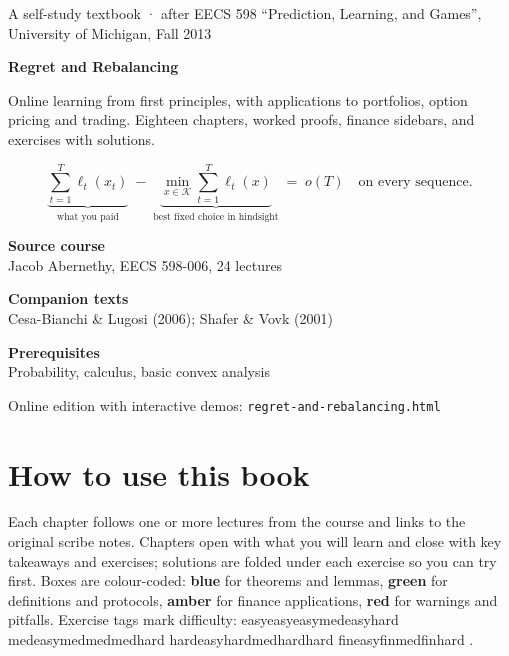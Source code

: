 \documentclass[11pt,a4paper,openany]{book}
\newcommand{\extag}[2]{%
  \def\tmp{#1}\def\tmpE{easy}\def\tmpM{med}\def\tmpH{hard}%
  \ifx\tmp\tmpE\def\tagc{defc}\else\ifx\tmp\tmpM\def\tagc{thmc}\else\ifx\tmp\tmpH\def\tagc{warnc}\else\def\tagc{finc}\fi\fi\fi
  \tcbox[on line,boxrule=0pt,arc=2pt,colback=\tagc!12,left=2pt,right=2pt,top=0pt,bottom=0pt,boxsep=1pt]{\sffamily\scriptsize\bfseries\color{\tagc}#2}}
\begin{document}
\frontmatter
\begin{titlepage}
\centering
\vspace*{2cm}
{\small\color{muted}\sffamily A self-study textbook · after EECS 598 “Prediction, Learning, and Games”, University of Michigan, Fall 2013\par}
\vspace{2.2cm}
{\fontsize{34}{40}\selectfont\bfseries\color{thmc} Regret and Rebalancing\par}
\vspace{1cm}
\begin{minipage}{0.8\linewidth}\centering\large Online learning from first principles, with applications to portfolios, option pricing and trading. Eighteen chapters, worked proofs, finance sidebars, and exercises with solutions.\end{minipage}
\vspace{1.6cm}
{\large\[\underbrace{\sum_{t=1}^{T}\ell_t(x_t)}_{\text{what you paid}}\;-\;\underbrace{\min_{x\in\mathcal K}\sum_{t=1}^{T}\ell_t(x)}_{\text{best fixed choice in hindsight}}\;=\;o(T)\quad\text{on every sequence.}\]}
\vfill
{\small\sffamily\noindent \begin{minipage}[t]{0.3\linewidth}\raggedright\textbf{Source course}\\ Jacob Abernethy, EECS 598-006, 24 lectures\end{minipage}\hfill\begin{minipage}[t]{0.3\linewidth}\raggedright\textbf{Companion texts}\\ Cesa-Bianchi \& Lugosi (2006); Shafer \& Vovk (2001)\end{minipage}\hfill\begin{minipage}[t]{0.3\linewidth}\raggedright\textbf{Prerequisites}\\ Probability, calculus, basic convex analysis\end{minipage}\par}
\vspace{1cm}
{\small\color{muted} Online edition with interactive demos: \texttt{regret-and-rebalancing.html}\par}
\end{titlepage}

\tableofcontents
\chapter*{How to use this book}

Each chapter follows one or more lectures from the course and links to the original scribe notes. Chapters open with what you will learn and close with key takeaways and exercises; solutions are folded under each exercise so you can try first. Boxes are colour-coded: \textcolor{thmc}{\textbf{blue}} for theorems and lemmas, \textcolor{defc}{\textbf{green}} for definitions and protocols, \textcolor{finc}{\textbf{amber}} for finance applications, \textcolor{warnc}{\textbf{red}} for warnings and pitfalls. Exercise tags mark difficulty: \extag{easy}{warm-up} \extag{med}{core} \extag{hard}{challenge} \extag{fin}{finance}.
\end{document}
